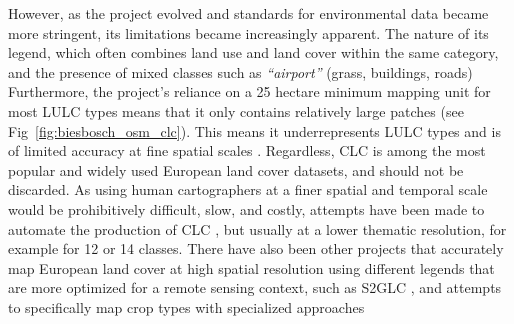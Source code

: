         However, as the project evolved and standards for environmental data became more stringent, its limitations became increasingly apparent. 
        The nature of its legend, which often combines land use and land cover within the same category, and the presence of mixed classes such as \emph{``airport''} (grass, buildings, roads)
        Furthermore, the project's reliance on a 25 hectare minimum mapping unit for most LULC types means that it only contains relatively large patches (see Fig\@~\ref{fig:biesbosch_osm_clc}). This means it underrepresents LULC types and is of limited accuracy at fine spatial scales \citep{buttner2014corine,aune2021content, pflugmacher2019mapping}. Regardless, CLC is among the most popular and widely used European land cover datasets, and should not be discarded. As using human cartographers at a finer spatial and temporal scale would be prohibitively difficult, slow, and costly, attempts have been made to automate the production of CLC \citep{buttner2014corine}, but usually at a lower thematic resolution, for example for 12 \citep{pflugmacher2019mapping} or 14 \citep{bhugra2022rapidai4eo} classes. There have also been other projects that accurately map European land cover at high spatial resolution using different legends that are more optimized for a remote sensing context, such as S2GLC \citep{malinowski2020}, and attempts to specifically map crop types with specialized approaches \citep{dandrimont2021parcel,luo2022developing}
        
